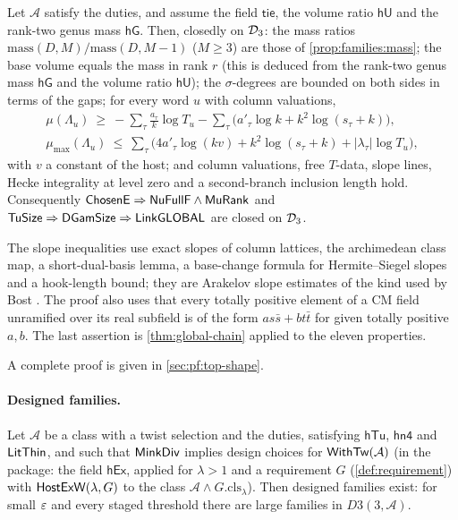 \begin{proposition}\Fmark\label{prop:families:famgl}
Let $\mathcal A$ satisfy the duties, and assume the field $\mathsf{tie}$, the volume ratio $\mathsf{hU}$ and the
rank-two genus mass $\mathsf{hG}$. Then, closedly on $\mathcal{D}_3$: the mass ratios
$\mathrm{mass}(D,M)/\mathrm{mass}(D,M-1)$ ($M\ge3$) are those of \cref{prop:families:mass}; the base volume equals
the mass in rank $r$ (this is deduced from the rank-two genus mass $\mathsf{hG}$ and the volume ratio $\mathsf{hU}$);
the $\sigma$-degrees are bounded on both sides in terms of the gaps; for every word $u$ with
column valuations,
\begin{gather*}
\mu(\Lambda_u)\ \ge\ -\sum_\tau\frac{a_\tau}{k}\log T_u-\sum_\tau\bigl(a'_\tau\log k+k^2\log(s_\tau+k)\bigr),\\
\mu_{\max}(\Lambda_u)\ \le\ \sum_\tau\bigl(4a'_\tau\log(kv)+k^2\log(s_\tau+k)+|\lambda_\tau|\log T_u\bigr),
\end{gather*}
with $v$ a constant of the host; and column valuations, free $T$-data, slope lines, Hecke integrality at level
zero and a second-branch inclusion length hold. Consequently $\mathsf{ChosenE}\Rightarrow
\mathsf{NuFullF}\wedge\mathsf{MuRank}$ and $\mathsf{TuSize}\Rightarrow\mathsf{DGamSize}\Rightarrow
\mathsf{LinkGLOBAL}$ are closed on $\mathcal{D}_3$.
\end{proposition}

\begin{proofoutline}
The slope inequalities use exact slopes of column lattices, the archimedean class map, a short-dual-basis
lemma, a base-change formula for Hermite--Siegel slopes and a hook-length bound; they are Arakelov slope
estimates of the kind used by Bost \cite{Bost1996,Bost2001}. The proof also uses that every totally positive
element of a CM field unramified over its real subfield is of the form $as\bar s+bt\bar t$ for given totally
positive $a,b$. The last assertion is \cref{thm:global-chain} applied to the eleven properties.

A complete proof is given in \cref{sec:pf:top-shape}.
\end{proofoutline}

\paragraph{Designed families.}
\begin{proposition}\Fmark\label{prop:families:design}
Let $\mathcal A$ be a class with a twist selection and the duties, satisfying $\mathsf{hTu}$, $\mathsf{hn4}$ and
$\mathsf{LitThin}$, and such that $\mathsf{MinkDiv}$ implies design choices for $\mathsf{WithTw}(\mathcal A)$ (in
the package: the field $\mathsf{hEx}$, applied for $\lambda>1$ and a requirement $G$ (\cref{def:requirement}) with
$\mathsf{HostExW}(\lambda,G)$ to the class $\mathcal A\wedge G.\mathrm{cls}_\lambda$). Then designed families exist: for
small $\varepsilon$ and every staged threshold there are large families in $D3(3,\mathcal A)$.
\end{proposition}

